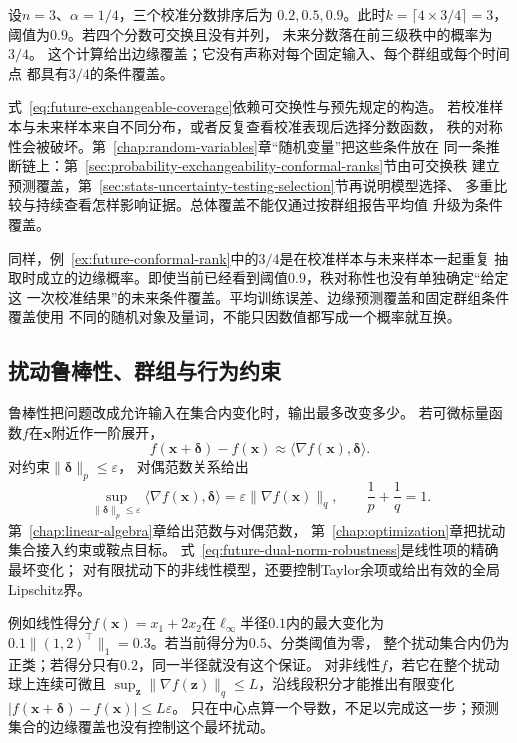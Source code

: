 \begin{example}[四个可交换分数的秩]
  \label{ex:future-conformal-rank}
  设$n=3$、$\alpha=1/4$，三个校准分数排序后为
  $0.2,0.5,0.9$。此时$k=\lceil4\times3/4\rceil=3$，
  阈值为$0.9$。若四个分数可交换且没有并列，
  未来分数落在前三级秩中的概率为$3/4$。
  这个计算给出边缘覆盖；它没有声称对每个固定输入、每个群组或每个时间点
  都具有$3/4$的条件覆盖。
\end{example}

式~\eqref{eq:future-exchangeable-coverage}依赖可交换性与预先规定的构造。
若校准样本与未来样本来自不同分布，或者反复查看校准表现后选择分数函数，
秩的对称性会被破坏。第~\ref{chap:random-variables}章“随机变量”把这些条件放在
同一条推断链上：第~\ref{sec:probability-exchangeability-conformal-ranks}节由可交换秩
建立预测覆盖，第~\ref{sec:stats-uncertainty-testing-selection}节再说明模型选择、
多重比较与持续查看怎样影响证据。总体覆盖不能仅通过按群组报告平均值
升级为条件覆盖。

同样，例~\ref{ex:future-conformal-rank}中的$3/4$是在校准样本与未来样本一起重复
抽取时成立的边缘概率。即使当前已经看到阈值$0.9$，秩对称性也没有单独确定“给定这
一次校准结果”的未来条件覆盖。平均训练误差、边缘预测覆盖和固定群组条件覆盖使用
不同的随机对象及量词，不能只因数值都写成一个概率就互换。


\subsection{扰动鲁棒性、群组与行为约束}
\label{sec:future-perturbations-groups-behavior}

鲁棒性把问题改成允许输入在集合内变化时，输出最多改变多少。
若可微标量函数$f$在$\bm{x}$附近作一阶展开，
\[
  f(\bm{x}+\bm{\delta})-f(\bm{x})
  \approx
  \langle\nabla f(\bm{x}),\bm{\delta}\rangle.
\]
对约束$\lVert\bm{\delta}\rVert_p\leq\varepsilon$，
对偶范数关系给出
\begin{equation}
  \sup_{\lVert\bm{\delta}\rVert_p\leq\varepsilon}
  \langle\nabla f(\bm{x}),\bm{\delta}\rangle
  =
  \varepsilon
  \lVert\nabla f(\bm{x})\rVert_q,
  \qquad
  \frac{1}{p}+\frac{1}{q}=1.
  \label{eq:future-dual-norm-robustness}
\end{equation}
第~\ref{chap:linear-algebra}章给出范数与对偶范数，
第~\ref{chap:optimization}章把扰动集合接入约束或鞍点目标。
式~\eqref{eq:future-dual-norm-robustness}是线性项的精确最坏变化；
对有限扰动下的非线性模型，还要控制Taylor余项或给出有效的全局Lipschitz界。

例如线性得分$f(\bm x)=x_1+2x_2$在$\ell_\infty$半径$0.1$内的最大变化为
$0.1\|(1,2)^\top\|_1=0.3$。若当前得分为$0.5$、分类阈值为零，
整个扰动集合内仍为正类；若得分只有$0.2$，同一半径就没有这个保证。
对非线性$f$，若它在整个扰动球上连续可微且
$\sup_{\bm z}\|\nabla f(\bm z)\|_q\leq L$，沿线段积分才能推出有限变化
$|f(\bm x+\bm\delta)-f(\bm x)|\leq L\varepsilon$。
只在中心点算一个导数，不足以完成这一步；预测集合的边缘覆盖也没有控制这个最坏扰动。

